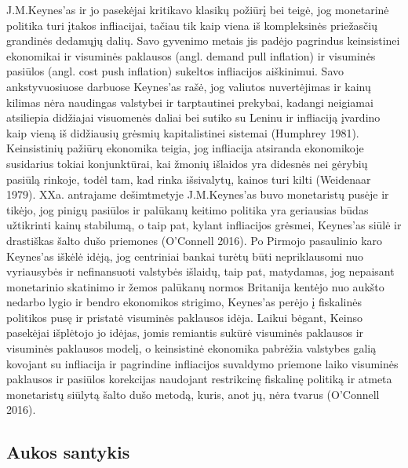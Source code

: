 \documentclass[
]{article}
\begin{document}
J.M.Keynes'as ir jo pasekėjai kritikavo klasikų požiūrį bei teigė, jog
monetarinė politika turi įtakos infliacijai, tačiau tik kaip viena iš
kompleksinės priežasčių grandinės dedamųjų dalių. Savo gyvenimo metais
jis padėjo pagrindus keinsistinei ekonomikai ir visuminės paklausos
(angl. demand pull inflation) ir visuminės pasiūlos (angl. cost push
inflation) sukeltos infliacijos aiškinimui. Savo ankstyvuosiuose
darbuose Keynes'as rašė, jog valiutos nuvertėjimas ir kainų kilimas nėra
naudingas valstybei ir tarptautinei prekybai, kadangi neigiamai
atsiliepia didžiajai visuomenės daliai bei sutiko su Leninu ir
infliaciją įvardino kaip vieną iš didžiausių grėsmių kapitalistinei
sistemai (Humphrey 1981). Keinsistinių pažiūrų ekonomika teigia, jog
infliacija atsiranda ekonomikoje susidarius tokiai konjunktūrai, kai
žmonių išlaidos yra didesnės nei gėrybių pasiūlą rinkoje, todėl tam, kad
rinka išsivalytų, kainos turi kilti (Weidenaar 1979). XXa. antrajame
dešimtmetyje J.M.Keynes'as buvo monetaristų pusėje ir tikėjo, jog pinigų
pasiūlos ir palūkanų keitimo politika yra geriausias būdas užtikrinti
kainų stabilumą, o taip pat, kylant infliacijos grėsmei, Keynes'as siūlė
ir drastiškas šalto dušo priemones (O'Connell 2016). Po Pirmojo
pasaulinio karo Keynes'as iškėlė idėją, jog centriniai bankai turėtų
būti nepriklausomi nuo vyriausybės ir nefinansuoti valstybės išlaidų,
taip pat, matydamas, jog nepaisant monetarinio skatinimo ir žemos
palūkanų normos Britanija kentėjo nuo aukšto nedarbo lygio ir bendro
ekonomikos strigimo, Keynes'as perėjo į fiskalinės politikos pusę ir
pristatė visuminės paklausos idėja. Laikui bėgant, Keinso pasekėjai
išplėtojo jo idėjas, jomis remiantis sukūrė visuminės paklausos ir
visuminės paklausos modelį, o keinsistinė ekonomika pabrėžia valstybes
galią kovojant su infliacija ir pagrindine infliacijos suvaldymo
priemone laiko visuminės paklausos ir pasiūlos korekcijas naudojant
restrikcinę fiskalinę politiką ir atmeta monetaristų siūlytą šalto dušo
metodą, kuris, anot jų, nėra tvarus (O'Connell 2016).

\hypertarget{aukos-santykis}{%
\subsection{Aukos santykis}\label{aukos-santykis}}
\end{document}
